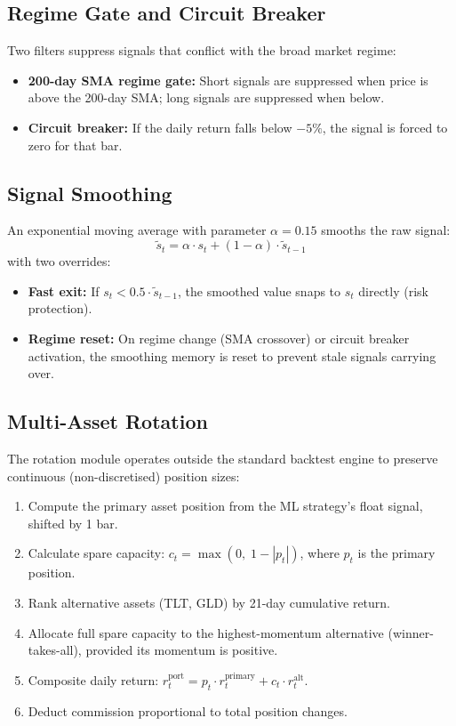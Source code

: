 \documentclass[11pt, a4paper]{article}
\begin{document}
\subsection{Regime Gate and Circuit Breaker}

Two filters suppress signals that conflict with the broad market regime:

\begin{itemize}[nosep]
    \item \textbf{200-day SMA regime gate:} Short signals are suppressed when price is above the 200-day SMA; long signals are suppressed when below.
    \item \textbf{Circuit breaker:} If the daily return falls below $-5\%$, the signal is forced to zero for that bar.
\end{itemize}

\subsection{Signal Smoothing}

An exponential moving average with parameter $\alpha = 0.15$ smooths the raw signal:
\[
    \tilde{s}_t = \alpha \cdot s_t + (1 - \alpha) \cdot \tilde{s}_{t-1}
\]
with two overrides:
\begin{itemize}[nosep]
    \item \textbf{Fast exit:} If $s_t < 0.5 \cdot \tilde{s}_{t-1}$, the smoothed value snaps to $s_t$ directly (risk protection).
    \item \textbf{Regime reset:} On regime change (SMA crossover) or circuit breaker activation, the smoothing memory is reset to prevent stale signals carrying over.
\end{itemize}

\subsection{Multi-Asset Rotation}

The rotation module operates outside the standard backtest engine to preserve continuous (non-discretised) position sizes:

\begin{enumerate}[nosep]
    \item Compute the primary asset position from the ML strategy's float signal, shifted by 1 bar.
    \item Calculate spare capacity: $c_t = \max(0,\; 1 - |p_t|)$, where $p_t$ is the primary position.
    \item Rank alternative assets (TLT, GLD) by 21-day cumulative return.
    \item Allocate full spare capacity to the highest-momentum alternative (winner-takes-all), provided its momentum is positive.
    \item Composite daily return: $r_t^{\text{port}} = p_t \cdot r_t^{\text{primary}} + c_t \cdot r_t^{\text{alt}}$.
    \item Deduct commission proportional to total position changes.
\end{enumerate}
\end{document}
